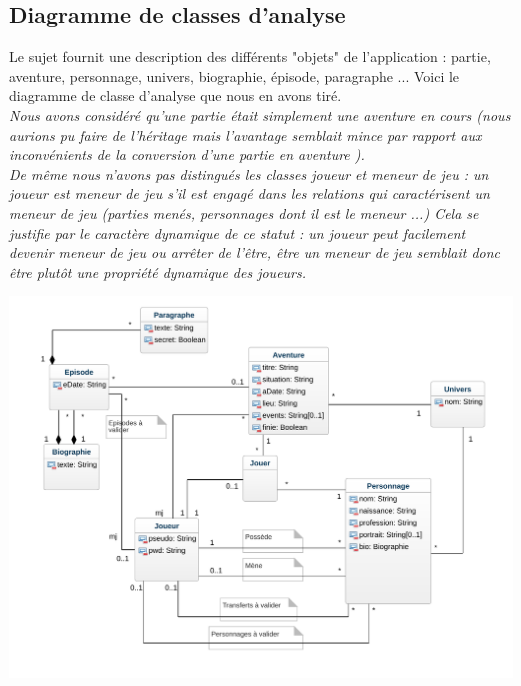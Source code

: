 \documentclass[a4paper, 11pt, titlepage]{article}
\begin{document}
\subsection{Diagramme de classes d'analyse}
Le sujet fournit une description des différents "objets" de l'application : partie, aventure, personnage, univers, biographie, épisode, paragraphe ... 
Voici le diagramme de classe d'analyse que nous en avons tiré.\\
\textit{Nous avons considéré qu'une partie était simplement une aventure en cours (nous aurions pu faire de l'héritage mais l'avantage semblait mince par rapport aux inconvénients de la conversion d'une partie en aventure ). \\
    De même nous n'avons pas distingués les classes joueur et meneur de jeu : un joueur est meneur de jeu s'il est engagé dans les relations qui caractérisent un meneur de jeu (parties menés, personnages dont il est le meneur ...) Cela se justifie par le caractère dynamique de ce  statut : un joueur peut facilement devenir meneur de jeu ou arrêter de l'être, être un meneur de jeu semblait donc être plutôt une propriété dynamique des joueurs. }
\begin{center}\includegraphics[scale=0.7]{analyse/classes.pdf} \end{center}







\end{document}
